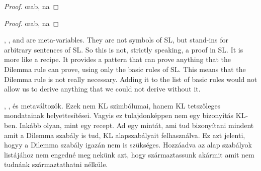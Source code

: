 \begin{proof}
	\open
		\open
		\close
		\open
		\close
		\oe{ab, na}
	\close
	 
\end{proof}

\begin{proof}
	\open
		\open
		\close
		\open
		\close
		\oe{ab, na}
	\close
	 
\end{proof}



, , and  are meta-variables. They are not symbols of SL, but stand-ins for arbitrary sentences of SL. So this is not, strictly speaking, a proof in SL. It is more like a recipe. It provides a pattern that can prove anything that the Dilemma rule can prove, using only the basic rules of SL. This means that the Dilemma rule is not really necessary. Adding it to the list of basic rules would not allow us to derive anything that we could not derive without it.

, , és  metaváltozók. Ezek nem KL szimbólumai, hanem KL tetszőleges mondatainak helyettesítései. Vagyis ez tulajdonképpen nem egy bizonyítás KL-ben. Inkább olyan, mint egy recept. Ad egy mintát, ami tud bizonyítani mindent amit a Dilemma szabály is tud, KL alapszabályait felhasználva. Ez azt jelenti, hogyy a Dilemma szabály igazán nem is szükséges. Hozzáadva az alap szabályok listájához nem engedné meg nekünk azt, hogy származtassunk akármit amit nem tudnánk származtathatni nélküle.

